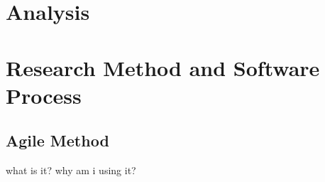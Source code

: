 \section{Analysis}
\begin{comment}
Taking into account the problem and what you learned from the background work, what was your analysis of the problem? How did your analysis help to decompose the problem into the main tasks that you would undertake? Were there alternative approaches? Why did you choose one approach compared to the alternatives? 

There should be a clear statement of the research questions, which you will evaluate at the end of the work. 

In most cases, the agreed objectives or requirements will be the result of a compromise between what would ideally have been produced and what was felt to be possible in the time available. A discussion of the process of arriving at the final list is usually appropriate.
\end{comment}


\section{Research Method and Software Process}
\begin{comment}
You need to describe briefly the life cycle model or research method that you used. You do not need to write about all of the different process models that you are aware of. Focus on the process model or research method that you have used. It is possible that you needed to adapt an existing method to suit your project; clearly identify what you used and how you adapted it for your needs.

For the research-oriented projects, there needs to be a suitable process for the construction of the software elements that support your work.
\end{comment}


\subsection{Agile Method}
what is it?
why am i using it?

